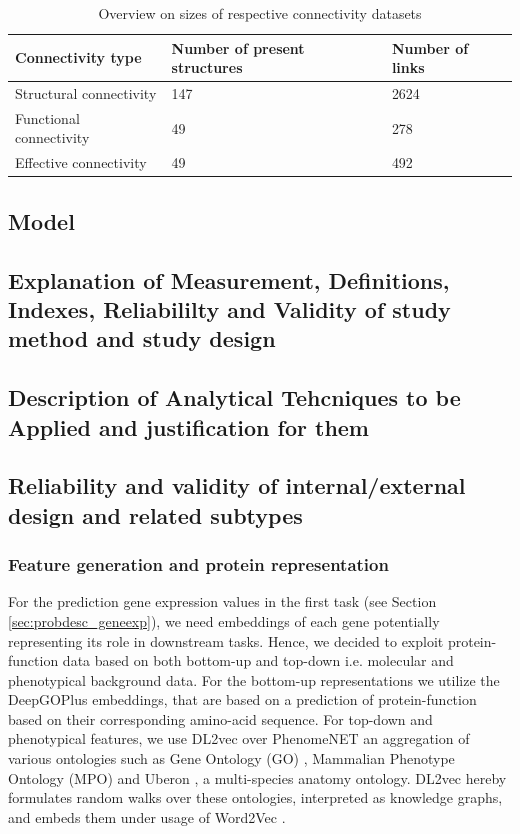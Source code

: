 \documentclass[]{article}
\renewcommand{\cite}{\citep}
\begin{document}
\begin{table}
	\centering
	\begin{tabular}{lll}
		Connectivity type&Number of present structures&Number of links\\
		\hline
		Structural connectivity&147&2624\\
		Functional connectivity&49&278\\
		Effective connectivity&49&492\\
	\end{tabular}
	\caption{Overview on sizes of respective connectivity datasets}
	\label{tab:conn_overview}
\end{table}

\subsection{Model}
\label{sec:modeldesc}
\subsection*{Explanation of Measurement, Definitions, Indexes, Reliabililty and Validity of study method and study design}
\subsection*{Description of Analytical Tehcniques to be Applied and justification for them}

\subsection*{Reliability and validity of internal/external design and related subtypes}

\subsubsection{Feature generation and protein representation}
\label{sec:feature_gen}
For the prediction gene expression values in the first task (see Section \ref{sec:probdesc_geneexp}), we need embeddings of each gene potentially representing its role in downstream tasks. Hence, we decided to exploit protein-function data based on both bottom-up and top-down i.e. molecular and phenotypical background data. For the bottom-up representations we utilize the DeepGOPlus \cite{DeepGoPlus} embeddings, that are based on a prediction of protein-function based on their corresponding amino-acid sequence. For top-down and phenotypical features, we use DL2vec \cite{DL2vec2020} over PhenomeNET\cite{PhenomeNET2011} an aggregation of various ontologies such as Gene Ontology (GO) \cite{GOoriginal2000, GOrecent2020}, Mammalian Phenotype Ontology (MPO) \cite{MP2009} and Uberon \cite{mungall2012uberon}, a multi-species anatomy ontology. DL2vec hereby formulates random walks over these ontologies, interpreted as knowledge graphs, and embeds them under usage of Word2Vec \cite{Word2vec2013}. 
\end{document}
